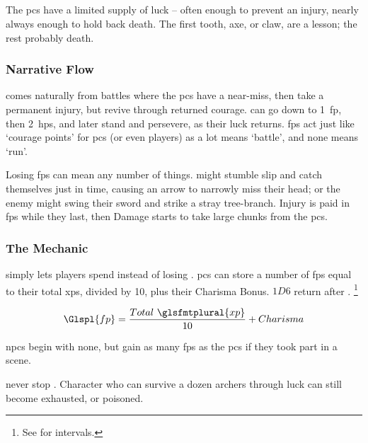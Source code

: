\begin{multicols}{2}
\subsection{}
\label{fate_points}

The \glspl{pc} have a limited supply of luck -- often enough to prevent an injury, nearly always enough to hold back death.
The first tooth, axe, or claw, are a lesson; the rest probably death.

\subsubsection{Narrative Flow}
comes naturally from battles where the \glspl{pc} have a near-miss, then take a permanent injury, but revive through returned courage.
 can go down to 1~\gls{fp}, then 2~\glspl{hp}, and  later stand and persevere, as their luck returns.
\Glspl{fp} act just like `courage points' for \glspl{pc} (or even players) as a lot means `battle', and none means `run'.

Losing \glspl{fp} can mean any number of things.
 might stumble slip and catch themselves just in time, causing an arrow to narrowly miss their head; or the enemy might swing their sword and strike a stray tree-branch.
Injury is paid in \glspl{fp} while they last, then Damage starts to take large chunks from the \glspl{pc}.

\subsubsection{The Mechanic}
simply lets players spend  instead of losing .
\Glspl{pc} can store a number of \glspl{fp} equal to their total \glspl{xp}, divided by 10, plus their Charisma Bonus.
$1D6$ return after .%
\footnote{See  for \glspl{interval}.}

\begin{center}
  $$\Glspl{fp} = \frac{Total~\glsfmtplural{xp}}{10} + Charisma$$
\end{center}

\Glspl{npc} begin with none, but gain as many \glspl{fp} as the \glspl{pc} if they took part in a scene.%

 never stop .
Character who can survive a dozen archers through luck can still become exhausted, or poisoned.

\end{multicols}

